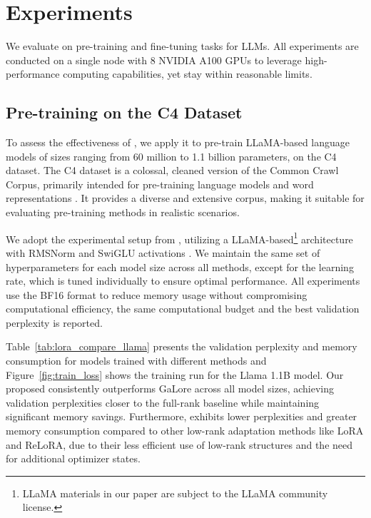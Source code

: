\section{Experiments}

We evaluate \textit{\lowrank} on pre-training and fine-tuning tasks for LLMs. All experiments are conducted on a single node with 8 NVIDIA A100 GPUs to leverage high-performance computing capabilities, yet stay within reasonable limits.

\subsection{Pre-training on the C4 Dataset}

To assess the effectiveness of \textit{\lowrank}, we apply it to pre-train LLaMA-based language models of sizes ranging from 60 million to 1.1 billion parameters, on the C4 dataset. The C4 dataset is a colossal, cleaned version of the Common Crawl Corpus, primarily intended for pre-training language models and word representations \citep{raffelExploringLimitsTransfer2020}. It provides a diverse and extensive corpus, making it suitable for evaluating pre-training methods in realistic scenarios.

We adopt the experimental setup from \citet{lialinReLoRAHighRankTraining2023}, utilizing a LLaMA-based\footnote[3]{LLaMA materials in our paper are subject to the LLaMA community license.} architecture with RMSNorm and SwiGLU activations \citep{shazeerGLUVariantsImprove2020,touvronLlamaOpenFoundation2023}. We maintain the same set of hyperparameters for each model size across all methods, except for the learning rate, which is tuned individually to ensure optimal performance. All experiments use the BF16 format to reduce memory usage without compromising computational efficiency, the same computational budget and the best validation perplexity is reported.





Table~\ref{tab:lora_compare_llama} presents the validation perplexity and memory consumption for models trained with different methods and Figure~\ref{fig:train_loss} shows the training run for the Llama 1.1B model. Our proposed \textit{\lowrank} consistently outperforms GaLore \citep{zhao2024galore} across all model sizes, achieving validation perplexities closer to the full-rank baseline while maintaining significant memory savings. Furthermore, \textit{\lowrank} exhibits lower perplexities and greater memory consumption compared to other low-rank adaptation methods like LoRA and ReLoRA, due to their less efficient use of low-rank structures and the need for additional optimizer states.

